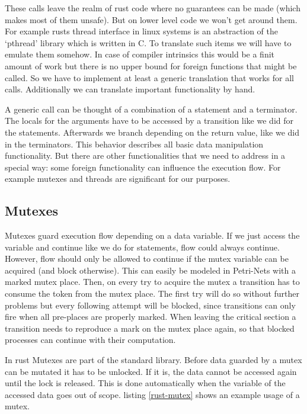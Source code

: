 These calls leave the realm of rust code where no guarantees can be made (which makes most of them unsafe).
But on lower level code we won't get around them.
For example rusts thread interface in linux systems is an abstraction of the `pthread' library which is written in C.
To translate such items we will have to emulate them somehow.
In case of compiler intrinsics this would be a finit amount of work but there is no upper bound for foreign functions that might be called.
So we have to implement at least a generic translation that works for all calls.
Additionally we can translate important functionality by hand.

A generic call can be thought of a combination of a statement and a terminator.
The locals for the arguments have to be accessed by a transition like we did for the statements.
Afterwards we branch depending on the return value, like we did in the terminators.
This behavior describes all basic data manipulation functionality.
But there are other functionalities that we need to address in a special way:
some foreign functionality can influence the execution flow.
For example mutexes and threads are significant for our purposes.

\subsection*{Mutexes}
Mutexes guard execution flow depending on a data variable.
If we just access the variable and continue like we do for statements, flow could always continue.
However, flow should only be allowed to continue if the mutex variable can be acquired (and block otherwise).
This can easily be modeled in Petri-Nets with a marked mutex place.
Then, on every try to acquire the mutex a transition has to consume the token from the mutex place.
The first try will do so without further problems but every following attempt will be blocked, since transitions can only fire when all pre-places are properly marked.
When leaving the critical section a transition needs to reproduce a mark on the mutex place again, so that blocked processes can continue with their computation.

In rust Mutexes are part of the standard library.
Before data guarded by a mutex can be mutated it has to be unlocked.
If it is, the data cannot be accessed again until the lock is released.
This is done automatically when the variable of the accessed data goes out of scope.
listing \ref{rust-mutex} shows an example usage of a mutex.

